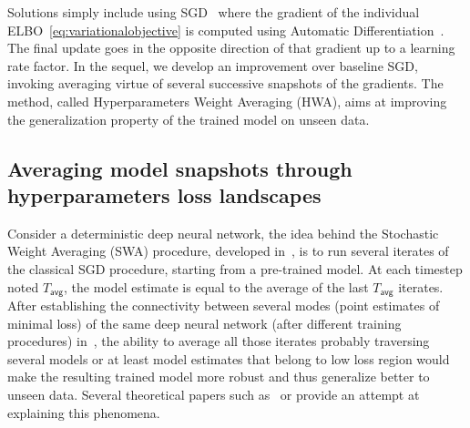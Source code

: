 \documentclass[tablecaption=bottom,wcp]{jmlr} %
\begin{document}
Solutions simply include using SGD~\citep{bottou2008tradeoffs} where the gradient of the individual ELBO~\eqref{eq:variationalobjective} is computed using Automatic Differentiation~\citep{kucukelbir2017automatic}. 
The final update goes in the opposite direction of that gradient up to a learning rate factor.
In the sequel, we develop an improvement over baseline SGD, invoking averaging virtue of several successive snapshots of the gradients.
The method, called Hyperparameters Weight Averaging (HWA), aims at improving the generalization property of the trained model on unseen data.


\subsection{Averaging model snapshots through hyperparameters loss landscapes}
Consider a deterministic deep neural network, the idea behind the Stochastic Weight Averaging (SWA) procedure, developed in~\citep{izmailov2018averaging}, is to run several iterates of the classical SGD procedure, starting from a pre-trained model.
At each timestep noted $T_{\mathsf{avg}}$, the model estimate is equal to the average of the last $T_{\mathsf{avg}}$ iterates.
After establishing the connectivity between several modes (point estimates of minimal loss) of the same deep neural network (after different training procedures) in~\citep{garipov2018loss}, the ability to average all those iterates probably traversing several models or at least model estimates that belong to low loss region would make the resulting trained model more robust and thus generalize better to unseen data.
Several theoretical papers such as~\citep{he2019asymmetric} or \citep{keskar2016large} provide an attempt at explaining this phenomena.
\end{document}

